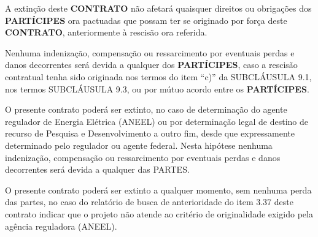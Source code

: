 \xx A extinção deste \textbf{CONTRATO} não afetará quaisquer direitos ou obrigações dos \textbf{PARTÍCIPES} ora pactuadas que possam ter se originado por força deste \textbf{CONTRATO}, anteriormente à rescisão ora referida.

\xx Nenhuma indenização, compensação ou ressarcimento por eventuais perdas e danos decorrentes será devida a qualquer dos \textbf{PARTÍCIPES}, caso a rescisão contratual tenha sido originada nos termos do item “c)” da SUBCLÁUSULA 9.1, nos termos SUBCLÁUSULA 9.3, ou por mútuo acordo entre os \textbf{PARTÍCIPES}.

\xx O presente contrato poderá ser extinto, no caso de determinação do agente regulador de Energia Elétrica (ANEEL) ou por determinação legal de destino de recurso de Pesquisa e Desenvolvimento a outro fim, desde que expressamente determinado pelo regulador ou agente federal. Nesta hipótese nenhuma indenização, compensação ou ressarcimento por eventuais perdas e danos decorrentes será devida a qualquer das PARTES.

\xx O presente contrato poderá ser extinto a qualquer momento, sem nenhuma perda das partes, no caso do relatório de busca de anterioridade do item 3.37 deste contrato indicar que o projeto não atende ao critério de originalidade exigido pela agência reguladora (ANEEL).